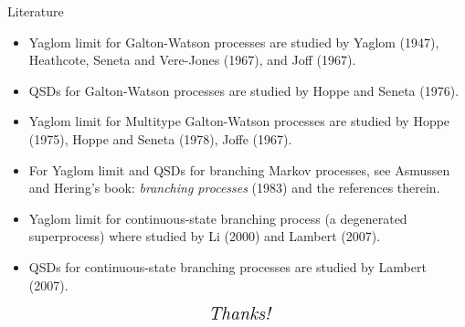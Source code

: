 \documentclass[xcolor=dvipsnames]{beamer}
\begin{document}
\begin{frame}{Literature}
\begin{itemize}
	\item Yaglom limit for Galton-Watson processes are studied by Yaglom (1947), Heathcote, Seneta and Vere-Jones (1967), and Joff (1967).
	\item QSDs for Galton-Watson processes are studied by Hoppe and Seneta (1976).
	\item Yaglom limit for Multitype Galton-Watson processes are studied by Hoppe (1975), Hoppe and Seneta (1978), Joffe (1967).
	\item For Yaglom limit and QSDs for branching Markov processes, see Asmussen and Hering's book: \emph{branching processes} (1983) and the references therein. 
	\item Yaglom limit for continuous-state branching process (a degenerated superprocess) where studied by Li (2000) and Lambert (2007).
	\item QSDs for continuous-state branching processes are studied by Lambert (2007).
\end{itemize}
\end{frame}

\begin{frame}
  \[ \text{ \it \Large Thanks!}\]
\end{frame}
\end{document}
